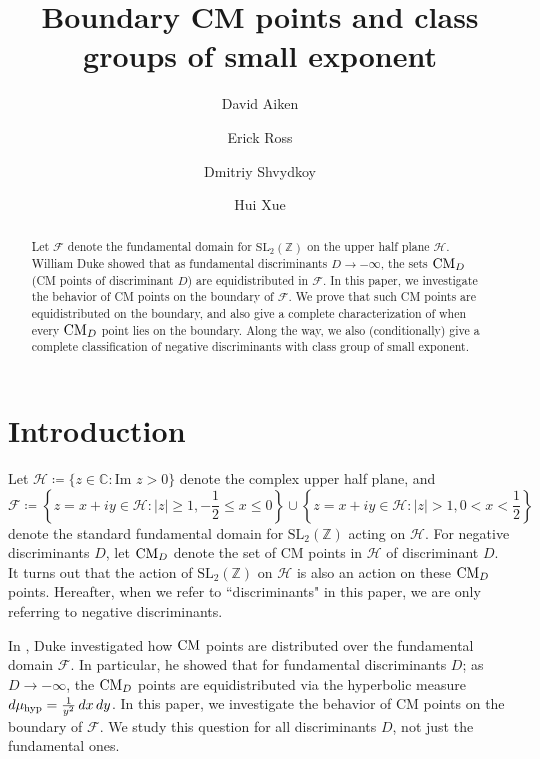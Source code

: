 \documentclass[11pt,letterpaper,reqno]{amsart}
\author{David Aiken}
\author[E. Ross]{Erick Ross}
\author[D. Shvydkoy]{Dmitriy Shvydkoy}
\author[H. Xue]{Hui Xue}
\title{Boundary CM points and class groups of small exponent}
\numberwithin{equation}{section}
\numberwithin{figure}{section}
\numberwithin{table}{section}
\newcommand{\lrcb}[1]{\left\{#1\right\}}
\newcommand{\ZZ}{\mathbb{Z}}
\newcommand{\CC}{\mathbb{C}}
\newcommand{\SL}{\text{SL}}
\newcommand{\FF}{\mathcal{F}}
\newcommand{\HH}{\mathcal{H}}
\newcommand{\CM}{\textnormal{CM}}
\begin{document}
\begin{abstract}
Let $\mathcal F$ denote the fundamental domain for $\text{SL}_2(\mathbb{Z})$ on the upper half plane $\mathcal H$.
William Duke showed that as fundamental discriminants $D \to -\infty$, the sets $\textnormal{CM}_{D}$ (CM points of discriminant $D$) are equidistributed in $\mathcal F$. In this paper, we investigate the behavior of CM points on the boundary of $\mathcal F$.
We prove that such CM points are equidistributed on the boundary, and also give a complete characterization of when every $\textnormal{CM}_D$ point lies on the boundary. 
Along the way, we also (conditionally) give a complete classification of 
negative discriminants with class group of small exponent.
\end{abstract}

\maketitle

\section{Introduction}



Let $\HH \coloneq \{z \in \CC : \text{Im } z > 0 \}$ denote the complex upper half plane, and 
\[
    \FF \coloneq  \lrcb{z = x+iy \in \mathcal{H} : |z| \geq 1, -\frac{1}{2} \leq x \leq 0} \cup \lrcb{z=x+iy \in \mathcal{H} : |z| > 1, 0 < x < \frac{1}{2}}
\]
denote the standard fundamental domain for $\SL_2(\ZZ)$ acting on $\HH$. 
For negative discriminants $D$, let $\CM_D$ denote the set of CM points in $\HH$ of discriminant $D$. It turns out that the action of $\SL_2(\ZZ)$ on $\HH$ is also an action on these $\CM_D$ points.  
Hereafter, when we refer to ``discriminants" in this paper, we are only referring to negative discriminants.



In \cite{duke}, Duke investigated how $\CM$ points are distributed over the fundamental domain $\FF$. In particular, he showed that for fundamental discriminants $D$; as $D \to -\infty$, the $\CM_D$ points are equidistributed via the hyperbolic measure $d\mu_{\textnormal{hyp}} = \frac{1}{y^2} \,dx\,dy$.
In this paper, we investigate the behavior of CM points on the boundary of $\FF$. We study this question for all discriminants $D$, not just the fundamental ones. 



\end{document}
